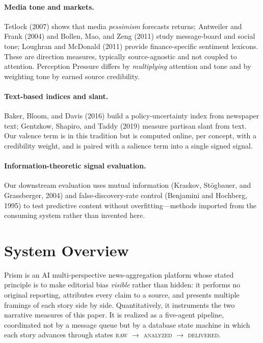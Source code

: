 \documentclass[11pt,a4paper]{article}
\theoremstyle{definition}
\begin{document}
\paragraph{Media tone and markets.}
Tetlock (2007) shows that media \emph{pessimism} forecasts returns; Antweiler and Frank (2004) and
Bollen, Mao, and Zeng (2011) study message-board and social tone; Loughran and McDonald (2011)
provide finance-specific sentiment lexicons. These are direction measures, typically source-agnostic
and not coupled to attention. Perception Pressure differs by \emph{multiplying} attention and tone
and by weighting tone by earned source credibility.

\paragraph{Text-based indices and slant.}
Baker, Bloom, and Davis (2016) build a policy-uncertainty index from newspaper text; Gentzkow,
Shapiro, and Taddy (2019) measure partisan slant from text. Our valence term is in this tradition but
is computed online, per concept, with a credibility weight, and is paired with a salience term into a
single signed signal.

\paragraph{Information-theoretic signal evaluation.}
Our downstream evaluation uses mutual information (Kraskov, St\"ogbauer, and Grassberger, 2004) and
false-discovery-rate control (Benjamini and Hochberg, 1995) to test predictive content without
overfitting---methods imported from the consuming system rather than invented here.

\section{System Overview}
\label{sec:system}

Prism is an AI multi-perspective news-aggregation platform whose stated principle is to make
editorial bias \emph{visible} rather than hidden: it performs no original reporting, attributes every
claim to a source, and presents multiple framings of each story side by side. Quantitatively, it
instruments the two narrative measures of this paper. It is realized as a five-agent pipeline,
coordinated not by a message queue but by a database state machine in which each story advances
through states \textsc{raw} $\to$ \textsc{analyzed} $\to$ \textsc{delivered}.
\end{document}
